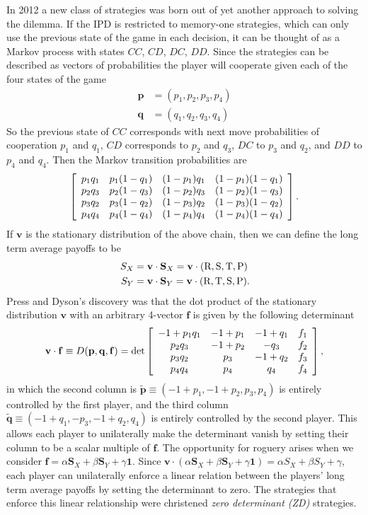 In 2012 a new class of strategies was born out of yet another approach to solving the dilemma. If the IPD is restricted to memory-one strategies, which can only use the previous state of the game in each decision, it can be thought of as a Markov process with states $CC$, $CD$, $DC$, $DD$. Since the strategies can be described as vectors of probabilities the player will cooperate given each of the four states of the game
\begin{align*}
\mathbf{p} &= (p_1, p_2, p_3, p_4) \\
\mathbf{q} &= (q_1, q_2, q_3, q_4)
\end{align*}
So the previous state of $CC$ corresponds with next move probabilities of cooperation $p_1$ and $q_1$, $CD$ corresponds to $p_2$ and $q_3$, $DC$ to $p_3$ and $q_2$, and $DD$ to $p_4$ and $q_4$. 
Then the Markov transition probabilities are
\[
\left[
\begin{array}{c c c c}
p_1q_1 & p_1 (1-q_1) & (1-p_1)q_1 & (1-p_1)(1-q_1) \\
p_2q_3 & p_2 (1-q_3) & (1-p_2)q_3 & (1-p_2)(1-q_3) \\
p_3q_2 & p_3 (1-q_2) & (1-p_3)q_2 & (1-p_3)(1-q_2) \\
p_4q_4 & p_4 (1-q_4) & (1-p_4)q_4 & (1-p_4)(1-q_4)
\end{array}
\right]
.\]
If $\mathbf{v}$ is the stationary distribution of the above chain, then we can define the long term average payoffs to be
\begin{align*}
S_X &= \mathbf{v} \cdot \mathbf{S}_X = \mathbf{v} \cdot (\textrm{R}, \textrm{S}, \textrm{T}, \textrm{P}) \\
S_Y &= \mathbf{v} \cdot \mathbf{S}_Y = \mathbf{v} \cdot (\textrm{R}, \textrm{T}, \textrm{S}, \textrm{P}).
\end{align*}
Press and Dyson's discovery was that the dot product of the stationary distribution $\mathbf{v}$ with an arbitrary 4-vector $\mathbf{f}$ is given by the following determinant
\[
\mathbf{v}\cdot \mathbf{f} \equiv D(\mathbf{p}, \mathbf{q}, \mathbf{f})
= \det
\left[
\begin{array}{c c c c}
-1 + p_1 q_1    &	-1 + p_1	&	-1 + q_1	&	f_1 \\
p_2 q_3         &	-1 + p_2	&	-q_3		&	f_2 \\
p_3 q_2 		&	p_3			&	-1 + q_2	&	f_3 \\
p_4 q_4			&	p_4			&	q_4			&	f_4
\end{array}
\right],
\]
in which the second column is $\tilde{\mathbf{p}} \equiv (-1 + p_1, -1 + p_2, p_3, p_4)$ is entirely controlled by the first player, and the third column $\tilde{\mathbf{q}} \equiv (-1 + q_1, -p_3, -1 + q_2, q_4)$ is entirely controlled by the second player. This allows each player to unilaterally make the determinant vanish by setting their column to be a scalar multiple of $\mathbf{f}$. The opportunity for roguery arises when we consider $\mathbf{f} = \alpha \mathbf{S}_X + \beta \mathbf{S}_Y + \gamma\mathbf{1}$. Since $\mathbf{v} \cdot  (\alpha \mathbf{S}_X + \beta \mathbf{S}_Y + \gamma\mathbf{1}) = \alpha S_X + \beta S_Y + \gamma$, each player can unilaterally enforce a linear relation between the players' long term average payoffs by setting the determinant to zero. The strategies that enforce this linear relationship were christened \textit{zero determinant (ZD)} strategies.

